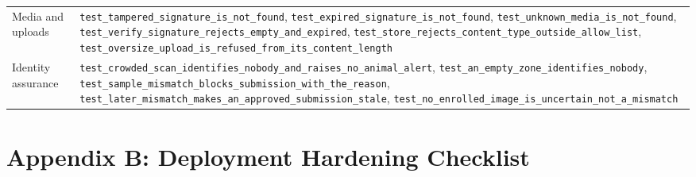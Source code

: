 \documentclass[11pt,letterpaper]{article}
\begin{document}
\begin{table}[H]
\begin{tabularx}{\textwidth}{>{\raggedright\arraybackslash}p{4.2cm}X}
Media and uploads & \texttt{test\_\allowbreak{}tampered\_\allowbreak{}signature\_\allowbreak{}is\_\allowbreak{}not\_\allowbreak{}found}, \texttt{test\_\allowbreak{}expired\_\allowbreak{}signature\_\allowbreak{}is\_\allowbreak{}not\_\allowbreak{}found}, \texttt{test\_\allowbreak{}unknown\_\allowbreak{}media\_\allowbreak{}is\_\allowbreak{}not\_\allowbreak{}found}, \texttt{test\_\allowbreak{}verify\_\allowbreak{}signature\_\allowbreak{}rejects\_\allowbreak{}empty\_\allowbreak{}and\_\allowbreak{}expired}, \texttt{test\_\allowbreak{}store\_\allowbreak{}rejects\_\allowbreak{}content\_\allowbreak{}type\_\allowbreak{}outside\_\allowbreak{}allow\_\allowbreak{}list}, \texttt{test\_\allowbreak{}oversize\_\allowbreak{}upload\_\allowbreak{}is\_\allowbreak{}refused\_\allowbreak{}from\_\allowbreak{}its\_\allowbreak{}content\_\allowbreak{}length} \\
Identity assurance & \texttt{test\_\allowbreak{}crowded\_\allowbreak{}scan\_\allowbreak{}identifies\_\allowbreak{}nobody\_\allowbreak{}and\_\allowbreak{}raises\_\allowbreak{}no\_\allowbreak{}animal\_\allowbreak{}alert}, \texttt{test\_\allowbreak{}an\_\allowbreak{}empty\_\allowbreak{}zone\_\allowbreak{}identifies\_\allowbreak{}nobody}, \texttt{test\_\allowbreak{}sample\_\allowbreak{}mismatch\_\allowbreak{}blocks\_\allowbreak{}submission\_\allowbreak{}with\_\allowbreak{}the\_\allowbreak{}reason}, \texttt{test\_\allowbreak{}later\_\allowbreak{}mismatch\_\allowbreak{}makes\_\allowbreak{}an\_\allowbreak{}approved\_\allowbreak{}submission\_\allowbreak{}stale}, \texttt{test\_\allowbreak{}no\_\allowbreak{}enrolled\_\allowbreak{}image\_\allowbreak{}is\_\allowbreak{}uncertain\_\allowbreak{}not\_\allowbreak{}a\_\allowbreak{}mismatch} \\
\bottomrule
\end{tabularx}
\end{table}

\section{Appendix B: Deployment Hardening Checklist}
\end{document}

